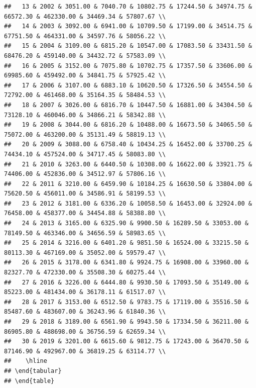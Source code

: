 \documentclass[
]{book}
\begin{document}
\begin{verbatim}
##   13 & 2002 & 3051.00 & 7040.70 & 10802.75 & 17244.50 & 34974.75 & 66572.30 & 462330.00 & 34469.34 & 57807.67 \\ 
##   14 & 2003 & 3092.00 & 6941.00 & 10709.50 & 17199.00 & 34514.75 & 67751.50 & 464331.00 & 34597.76 & 58056.22 \\ 
##   15 & 2004 & 3109.00 & 6815.20 & 10547.00 & 17083.50 & 33431.50 & 68476.20 & 459140.00 & 34432.72 & 57583.09 \\ 
##   16 & 2005 & 3152.00 & 7075.80 & 10702.75 & 17357.50 & 33606.00 & 69985.60 & 459492.00 & 34841.75 & 57925.42 \\ 
##   17 & 2006 & 3107.00 & 6883.10 & 10620.50 & 17326.50 & 34554.50 & 72792.00 & 461468.00 & 35164.35 & 58484.53 \\ 
##   18 & 2007 & 3026.00 & 6816.70 & 10447.50 & 16881.00 & 34304.50 & 73128.10 & 460046.00 & 34866.21 & 58342.88 \\ 
##   19 & 2008 & 3044.00 & 6816.20 & 10488.00 & 16673.50 & 34065.50 & 75072.00 & 463200.00 & 35131.49 & 58819.13 \\ 
##   20 & 2009 & 3088.00 & 6758.40 & 10434.25 & 16452.00 & 33700.25 & 74434.10 & 457524.00 & 34717.45 & 58083.80 \\ 
##   21 & 2010 & 3263.00 & 6440.50 & 10308.00 & 16622.00 & 33921.75 & 74406.00 & 452836.00 & 34512.97 & 57806.16 \\ 
##   22 & 2011 & 3210.00 & 6459.90 & 10184.25 & 16630.50 & 33804.00 & 75620.50 & 456011.00 & 34586.91 & 58199.53 \\ 
##   23 & 2012 & 3181.00 & 6336.20 & 10058.50 & 16453.00 & 32924.00 & 76458.00 & 458377.00 & 34454.88 & 58388.80 \\ 
##   24 & 2013 & 3165.00 & 6325.90 & 9900.50 & 16289.50 & 33053.00 & 78149.50 & 463346.00 & 34656.59 & 58983.65 \\ 
##   25 & 2014 & 3216.00 & 6401.20 & 9851.50 & 16524.00 & 33215.50 & 80113.30 & 467169.00 & 35052.00 & 59579.47 \\ 
##   26 & 2015 & 3178.00 & 6341.80 & 9924.75 & 16908.00 & 33960.00 & 82327.70 & 472330.00 & 35508.30 & 60275.44 \\ 
##   27 & 2016 & 3226.00 & 6444.80 & 9930.50 & 17093.50 & 35149.00 & 85223.00 & 481434.00 & 36178.11 & 61517.07 \\ 
##   28 & 2017 & 3153.00 & 6512.50 & 9783.75 & 17119.00 & 35516.50 & 85487.60 & 483607.00 & 36243.96 & 61840.36 \\ 
##   29 & 2018 & 3189.00 & 6561.90 & 9943.50 & 17334.50 & 36211.00 & 86905.80 & 488698.00 & 36756.59 & 62659.34 \\ 
##   30 & 2019 & 3201.00 & 6615.60 & 9812.75 & 17243.00 & 36470.50 & 87146.90 & 492967.00 & 36819.25 & 63114.77 \\ 
##    \hline
## \end{tabular}
## \end{table}
\end{verbatim}
\end{document}

